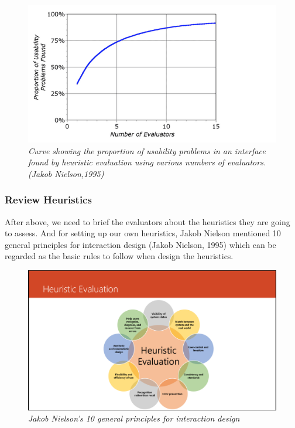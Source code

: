 \documentclass[twocolumn]{article}
\begin{document}
\begin{figure}
  \centering
  \includegraphics[width=\columnwidth, clip=true, trim=0 0 140 0]{fig/usability-problems-found.png}
  \caption{\emph{Curve showing the proportion of usability problems in an interface found by heuristic evaluation using various numbers of evaluators. (Jakob Nielson,1995)}}
  \label{fig:usability-problems-found}
\end{figure}

\subsubsection{Review Heuristics}
After above, we need to brief the evaluators about the heuristics they are going to assess. And for setting up our own heuristics, Jakob Nielson mentioned 10 general principles for interaction design (Jakob Nielson, 1995) which can be regarded as the basic rules to follow when design the heuristics.

\begin{figure}
  \centering
  \includegraphics[width=\columnwidth, clip=true, trim=380 5 300 160]{fig/heuristic-evaluation.png}
  \caption{\emph{Jakob Nielson's 10 general principles for interaction design}}
  \label{fig:heuristic-evaluation}
\end{figure}
\end{document}

